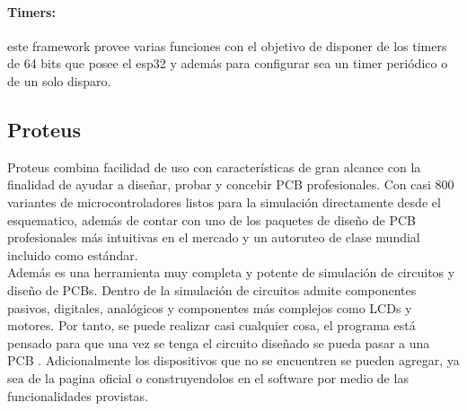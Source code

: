\paragraph{Timers:}este framework provee varias funciones con el objetivo de disponer de los timers de 64 bits que posee el esp32 y además para configurar sea un timer periódico o de un solo disparo.

\subsection{Proteus}

Proteus combina facilidad de uso con características de gran alcance con la finalidad de ayudar a diseñar, probar y concebir PCB profesionales. Con casi 800 variantes de microcontroladores listos para la simulación directamente desde el esquematico, además de contar con uno de los paquetes de diseño de PCB profesionales más intuitivas en el mercado y un autoruteo de clase mundial incluido como estándar. \cite{Prot1} \\

Además es una herramienta muy completa y potente de simulación de circuitos y diseño de PCBs. Dentro de la simulación de circuitos admite componentes pasivos, digitales, analógicos y componentes más complejos como LCDs y motores. Por tanto, se puede realizar casi cualquier cosa, el programa está pensado para que una vez se tenga el circuito diseñado se pueda pasar a una PCB \cite{Prot2}. Adicionalmente los dispositivos que no se encuentren se pueden agregar, ya sea de la pagina oficial o construyendolos en el software por medio de las funcionalidades provistas.
